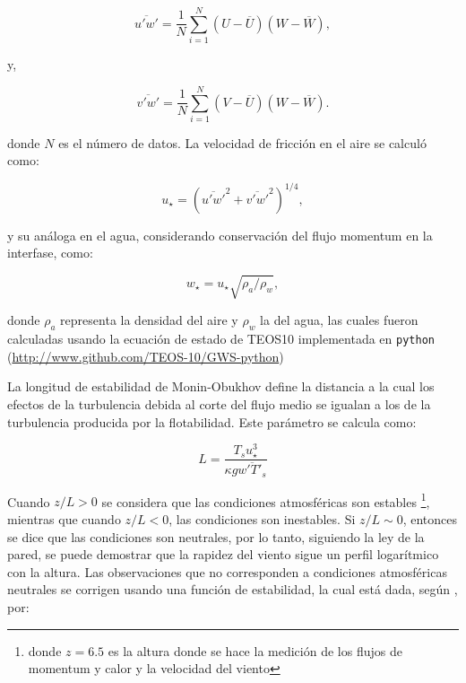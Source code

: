 \documentclass[11pt]{article}
\begin{document}
\begin{equation}
  \overline{u'w'} = \frac{1}{N} \sum_{i=1}^{N} (U-\overline{U})(W-\overline{W}),
\end{equation}

y,

\begin{equation}
  \overline{v'w'} = \frac{1}{N} \sum_{i=1}^{N} (V-\overline{U})(W-\overline{W}).
\end{equation}

donde $N$ es el número de datos. La velocidad de fricción en el aire se calculó
como:

\begin{equation}
  u_\star = \left( \overline{u'w'}^2 + \overline{v'w'}^2 \right)^{1/4},
\end{equation}

y su análoga en el agua, considerando conservación del flujo momentum en la
interfase, como:

\begin{equation}
  w_\star =  u_\star \sqrt{\rho_a / \rho_w},
\end{equation}

donde $\rho_a$ representa la densidad del aire y $\rho_w$ la del agua, las
cuales fueron calculadas usando la ecuación de estado de TEOS10 implementada en
\texttt{python} (\url{http://www.github.com/TEOS-10/GWS-python})

La longitud de estabilidad de Monin-Obukhov define la distancia a la cual los
efectos de la turbulencia debida al corte del flujo medio se igualan a los de la
turbulencia producida por la flotabilidad. Este parámetro se calcula como:

\begin{equation}
  L = \frac{T_s u_\star^3}{\kappa g \overline{w'T'_s}}
\end{equation}

Cuando $z/L>0$ se considera que las condiciones atmosféricas son estables
\footnote{donde $z=6.5$ es la altura donde se hace la medición de los flujos de
momentum y calor y la velocidad del viento}, mientras que cuando $z/L<0$, las
condiciones son inestables. Si $z/L \sim 0$, entonces se dice que las
condiciones son neutrales, por lo tanto, siguiendo la ley de la pared, se puede
demostrar que la rapidez del viento sigue un perfil logarítmico con la altura.
Las observaciones que no corresponden a condiciones atmosféricas neutrales se
corrigen usando una función de estabilidad, la cual está dada, según
\citet{Hogstrom1988}, por:
\end{document}
